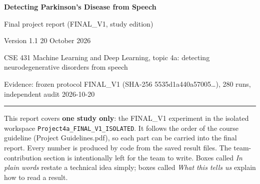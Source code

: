 \documentclass[11pt,a4paper]{article}
\begin{document}
\begin{center}{\LARGE\bfseries Detecting Parkinson's Disease from Speech\par}\vspace{6pt}
{\Large Final project report (FINAL\_V1, study edition)\par}\vspace{4pt}
{\large Version 1.1 \textperiodcentered{} 20 October 2026\par}\vspace{6pt}
{\normalsize CSE 431 Machine Learning and Deep Learning, topic 4a: detecting neurodegenerative disorders from speech\par}\vspace{3pt}
{\small Evidence: frozen protocol FINAL\_V1 (SHA-256 5535d1a440a57005\ldots), 280 runs, independent audit \textperiodcentered{} 2026-10-20\par}\end{center}
\vspace{4pt}\hrule\vspace{6pt}
\tableofcontents
\newpage
\begin{tcolorbox}[colback=gray!5,colframe=gray!60!black,boxrule=0.5pt,arc=2pt,left=5pt,right=5pt,top=3pt,bottom=3pt,title={\small\bfseries Note}]\small This report covers \textbf{one study only}: the FINAL\_V1 experiment in the isolated workspace \texttt{Project4a\_\allowbreak{}FINAL\_\allowbreak{}V1\_\allowbreak{}ISOLATED}. It follows the order of the course guideline (Project Guidelines.pdf), so each part can be carried into the final report. Every number is produced by code from the saved result files. The team-contribution section is intentionally left for the team to write. Boxes called \emph{In plain words} restate a technical idea simply; boxes called \emph{What this tells us} explain how to read a result.\end{tcolorbox}
\end{document}
